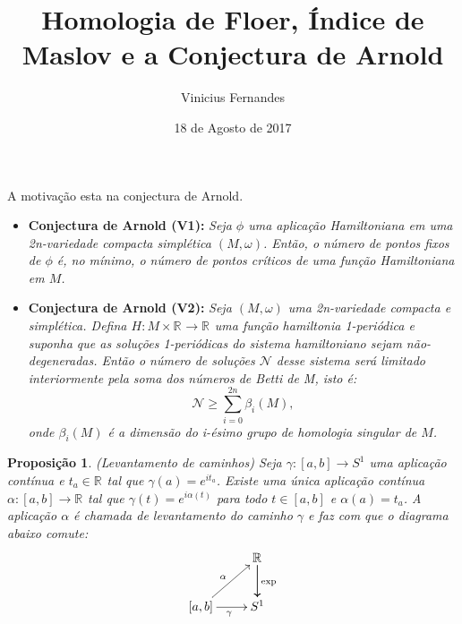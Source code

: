 \documentclass{beamer}
\author{Vinicius Fernandes}
\title{Homologia de Floer, Índice de Maslov e a Conjectura de Arnold}
\institute{Universidade Federal do ABC}
\date{18 de Agosto de 2017}
\newtheorem{proposicao}[teorema]{Proposição}
\newcommand{\real}[1]{\mathbb{R}^{#1}}
\newcommand{\reta}{\real{}}
\begin{document}
	
\begin{frame}[t,plain]
\titlepage
\end{frame}

\begin{frame}
	
	A motivação esta na conjectura de Arnold.
	
	\begin{itemize}
		\item \textbf{Conjectura de Arnold (V1):} \textit{Seja $\phi$ uma aplicação Hamiltoniana em uma 2n-variedade compacta simplética $(M, \omega)$. Então, o número de pontos fixos de $\phi$ é, no mínimo, o número de pontos críticos de uma função Hamiltoniana em $M$.}
		\item \textbf{Conjectura de Arnold (V2):} \textit	{Seja $(M,\omega)$ uma 2n-variedade compacta e simplética. Defina  $H:M\times \real{} \to \reta$  uma função hamiltonia 1-periódica e suponha que as soluções 1-periódicas do sistema hamiltoniano sejam não-degeneradas. Então o número de soluções $\mathcal{N}$ desse sistema será limitado interiormente pela soma dos números de Betti de M, isto é:
			$$
			\mathcal{N}\geq \sum_{i=0}^{2n}\beta_{i}(M),
			$$
			onde $\beta_{i}(M)$ é a dimensão do i-ésimo grupo de homologia singular de $M$.}
	\end{itemize}
\end{frame}

\begin{frame}
	
	\begin{proposicao}
		(Levantamento de caminhos) Seja $\gamma:[a,b] \to S^{1}$ uma aplicação contínua e $t_{a}\in \real{}$ tal que $\gamma(a) = e^{it_{a}}$. Existe uma única aplicação contínua $\alpha:[a,b] \to \real{}$ tal que $\gamma(t) = e^{i\alpha(t)}$ para todo $t\in [a,b]$ e $\alpha(a) = t_{a}$. A aplicação $\alpha$ é chamada de levantamento do caminho $\gamma$ e faz com que o diagrama abaixo comute:
		$$
		\xymatrix{
			& \real{}\ar[d]\ar[d]^{\text{exp}}
			\\
			[a,b]\ar[ur]^{\alpha} \ar[r]_{\gamma} & S^{1}
		}
		$$
	\end{proposicao}
	
\end{frame}
\end{document}
